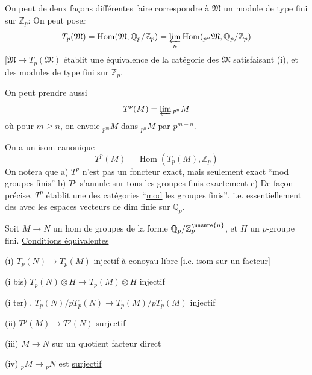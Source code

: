 On peut de deux façons différentes faire correspondre à $\mathfrak M$ un module de type fini sur $\mathbb Z_p$:
On peut poser
\[
T_p(\mathfrak M)=\operatorname{Hom}(\mathfrak M,\mathbb Q_p/\mathbb Z_p)=\varprojlim_n\operatorname{Hom}({}_{p^n}\mathfrak M,\mathbb Q_p/\mathbb Z_p)
\]
[$\mathfrak M\mapsto T_p(\mathfrak M)$ établit une équivalence de la catégorie des $\mathfrak M$ satisfaisant (i), et des modules de type fini sur $\mathbb Z_p$.

On peut prendre aussi
\[
T^p(M)=\varprojlim {}_{p^n}M
\]
où pour $m\geq n$, on envoie ${}_{p^m}M$ dans ${}_{p^n}M$ par $p^{m-n}$.

On a un isom canonique
\[
T^p(M)=\operatorname{Hom}(T_p(M),\mathbb Z_p)
\]
On notera que a) $T^p$ n'est pas un foncteur exact, mais seulement exact ``mod groupes finis'' b) $T^p$ s'annule sur tous les groupes finis exactement c) De façon précise, $T^p$ établit une  des catégories ``\uline{mod} les groupes finis'', i.e. essentiellement des  avec les espaces vecteurs de dim finie sur $\mathbb Q_p$.

Soit $M\longrightarrow N$ un hom de groupes de la forme $\mathbb Q_p/\mathbb Z_p^{\unsure{n}}$, et $H$ un $p$-groupe fini. \uline{Conditions équivalentes}

(i) $T_p(N)\longrightarrow T_p(M)$ injectif à conoyau libre [i.e. isom sur un facteur]

(i bis) $T_p(N)\otimes H\longrightarrow T_p(M)\otimes H$ injectif

(i ter) , $T_p(N)/pT_p(N)\longrightarrow T_p(M)/pT_p(M)$ injectif

(ii) $T^p(M)\longrightarrow T^p(N)$ surjectif

(iii) $M\longrightarrow N$  sur un quotient facteur direct

(iv) ${}_pM\longrightarrow {}_pN$ est \uline{surjectif}

